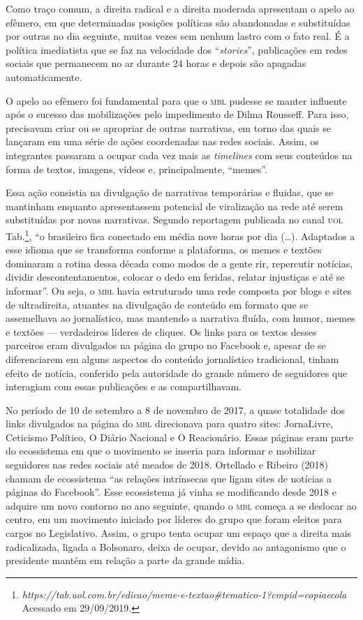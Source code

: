 Como traço comum, a direita radical e a direita moderada apresentam o
apelo ao efêmero, em que determinadas posições políticas são abandonadas
e substituídas por outras no dia seguinte, muitas vezes sem nenhum
lastro com o fato real. É a política imediatista que se faz na
velocidade dos ``\emph{stories}'', publicações em redes sociais que
permanecem no ar durante 24 horas e depois são apagadas automaticamente.

O apelo ao efêmero foi fundamental para que o \textsc{mbl} pudesse se manter
influente após o sucesso das mobilizações pelo impedimento de Dilma
Rousseff. Para isso, precisavam criar ou se apropriar de outras
narrativas, em torno das quais se lançaram em uma série de ações
coordenadas nas redes sociais. Assim, os integrantes passaram a ocupar
cada vez mais as \emph{timelines} com seus conteúdos na forma de textos,
imagens, vídeos e, principalmente, ``memes''.

Essa ação consistia na divulgação de narrativas temporárias e fluidas,
que se mantinham enquanto apresentassem potencial de viralização na rede
até serem substituídas por novas narrativas. Segundo reportagem
publicada no canal \textsc{uol} Tab.\footnote{\emph{https://tab.uol.com.br/edicao/meme-e-textao\#tematico-1?cmpid=copiaecola}
  Acessado em 29/09/2019.}, ``o brasileiro fica conectado em média nove
horas por dia (\ldots{}). Adaptados a esse idioma que se transforma conforme
a plataforma, os memes e textões dominaram a rotina dessa década como
modos de a gente rir, repercutir notícias, dividir descontentamentos,
colocar o dedo em feridas, relatar injustiças e até se informar''. Ou
seja, o \textsc{mbl} havia estruturado uma rede composta por blogs e sites de
ultradireita, atuantes na divulgação de conteúdo em formato que se
assemelhava ao jornalístico, mas mantendo a narrativa fluída, com humor,
memes e textões --- verdadeiros líderes de cliques. Os links para os
textos desses parceiros eram divulgados na página do grupo no Facebook
e, apesar de se diferenciarem em alguns aspectos do conteúdo
jornalístico tradicional, tinham efeito de notícia, conferido pela
autoridade do grande número de seguidores que interagiam com essas
publicações e as compartilhavam.

No período de 10 de setembro a 8 de novembro de 2017, a quase totalidade
dos links divulgados na página do \textsc{mbl} direcionava para quatro sites:
JornaLivre, Ceticismo Político, O Diário Nacional e O Reacionário. Essas
páginas eram parte do ecossistema em que o movimento se inseria para
informar e mobilizar seguidores nas redes sociais até meados de 2018.
Ortellado e Ribeiro (2018) chamam de ecossistema ``as relações
intrínsecas que ligam sites de notícias a páginas do Facebook''. Esse
ecossistema já vinha se modificando desde 2018 e adquire um novo
contorno no ano seguinte, quando o \textsc{mbl} começa a se deslocar ao centro,
em um movimento iniciado por líderes do grupo que foram eleitos para
cargos no Legislativo. Assim, o grupo tenta ocupar um espaço que a
direita mais radicalizada, ligada a Bolsonaro, deixa de ocupar, devido
ao antagonismo que o presidente mantém em relação a parte da grande
mídia.

